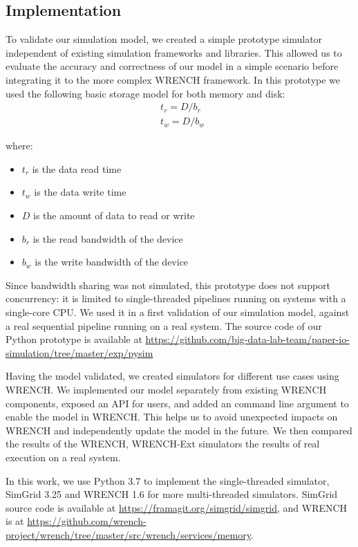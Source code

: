 \documentclass[conference]{IEEEtran}
\begin{document}
		\subsection{Implementation}

			To validate our simulation model, we created a simple prototype
			simulator independent of existing simulation frameworks and libraries. 
			This allowed us to evaluate the accuracy and correctness of our 
			model in a simple scenario before integrating it to the more complex 
			WRENCH framework. 
			In this prototype we used the following basic storage model for 
			both memory and disk: 
			\begin{align*}
				& t_{r} = D / b_r \\ 
				& t_{w} = D / b_w\
			\end{align*}		
			
			where:
			\begin{itemize}
				\item $t_{r}$ is the data read time
				\item $t_{w}$ is the data write time
				\item $D$ is the amount of data to read or write
				\item $b_r$ is the read bandwidth of the device
				\item $b_w$ is the write bandwidth of the device
			\end{itemize}			

			Since bandwidth sharing was not simulated, this prototype does not support 
			concurrency: it is limited to single-threaded pipelines running on systems 
			with a single-core CPU. We used it in a first validation of our simulation 
			model, against a real sequential pipeline running on a real system.
			The source code of our Python prototype is available at 
			\url{https://github.com/big-data-lab-team/paper-io-simulation/tree/master/exp/pysim}
			
			Having the model validated, we created simulators for different use cases 
			using WRENCH.
			We implemented our model separately from existing WRENCH components, 
			exposed an API for users, and added an command line argument to enable 
			the model in WRENCH. 
			This helps us to avoid unexpected impacts on WRENCH and 
			independently update the model in the future. 
			We then compared the results of the WRENCH, WRENCH-Ext simulators 
			the results of real execution on a real system. 
		
			In this work, we use Python 3.7 to implement the single-threaded simulator, 
			SimGrid 3.25 and WRENCH 1.6 for more multi-threaded simulators. 
			SimGrid source code is available at \url{https://framagit.org/simgrid/simgrid}, 
			and WRENCH is at 
			\url{https://github.com/wrench-project/wrench/tree/master/src/wrench/services/memory}.
			
\end{document}
